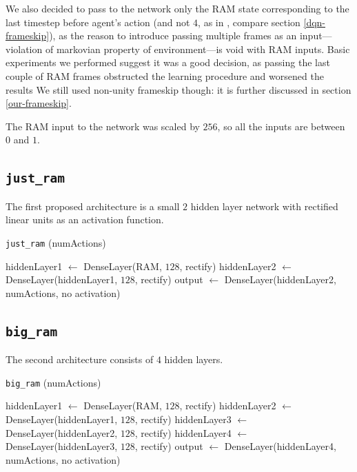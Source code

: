 We also decided to pass to the network only the RAM state corresponding to the last timestep before agent's action (and not $4$, as in \cite{nips-dqn}, compare section \ref{dqn-frameskip}), as the reason to introduce passing multiple frames as an input---violation of markovian property of environment---is void with RAM inputs.
Basic experiments we performed suggest it was a good decision, as passing the last couple of RAM frames obstructed the learning procedure and worsened the results
We still used non-unity frameskip though: it is further discussed in section \ref{our-frameskip}.

The RAM input to the network was scaled by $256$, so all the inputs are between $0$ and $1$.

\subsection{\texttt{just\_ram}}
The first proposed architecture is a small $2$ hidden layer network with rectified linear units as an activation function.

\begin{algorithm}[H]
\DontPrintSemicolon
\AlFnt{\small\sf}
\caption{\texttt{just\_ram} (numActions)}
\SetAlgoVlined

\AlFnt{\small\sf}
\vspace{0.05cm}
hiddenLayer1 $\leftarrow$ DenseLayer(RAM, $128$, rectify)\;
hiddenLayer2 $\leftarrow$ DenseLayer(hiddenLayer1, $128$, rectify)\;
output $\leftarrow$ DenseLayer(hiddenLayer2, numActions, no activation)\;

\end{algorithm}
\subsection{\texttt{big\_ram}}
The second architecture consists of $4$ hidden layers.


\begin{algorithm}[H]
\DontPrintSemicolon
\AlFnt{\small\sf}
\caption{\texttt{big\_ram} (numActions)}

\SetAlgoVlined

\vspace{0.05cm}

hiddenLayer1 $\leftarrow$ DenseLayer(RAM, $128$, rectify)\;
hiddenLayer2 $\leftarrow$ DenseLayer(hiddenLayer1, $128$, rectify)\;
hiddenLayer3 $\leftarrow$ DenseLayer(hiddenLayer2, $128$, rectify)\;
hiddenLayer4 $\leftarrow$ DenseLayer(hiddenLayer3, $128$, rectify)\;
output $\leftarrow$ DenseLayer(hiddenLayer4, numActions, no activation)\;

\end{algorithm}

